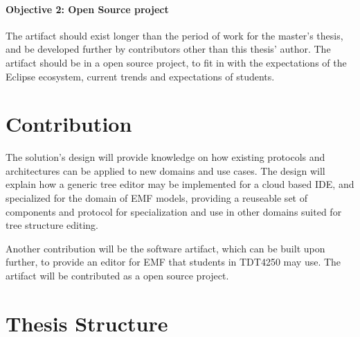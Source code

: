 \paragraph{Objective 2: Open Source project}
The artifact should exist longer than the period of work for the master's thesis, and be developed further by contributors other than this thesis' author.
The artifact should be in a \gls{open source} project, to fit in with the expectations of the Eclipse ecosystem, current trends and expectations of students.


\section{Contribution}
The solution's design will provide knowledge on how existing protocols and architectures can be applied to new domains and use cases.
The design will explain how a generic tree editor may be implemented for a cloud based \acrshort{IDE}, and specialized for the domain of \gls{EMF} models, providing a reuseable set of components and protocol for specialization and use in other domains suited for tree structure editing.

Another contribution will be the software artifact, which can be built upon further, to provide an editor for \acrshort{EMF} that students in \gls{TDT4250} may use.
The artifact will be contributed as a \gls{open source} project.

\section{Thesis Structure}
